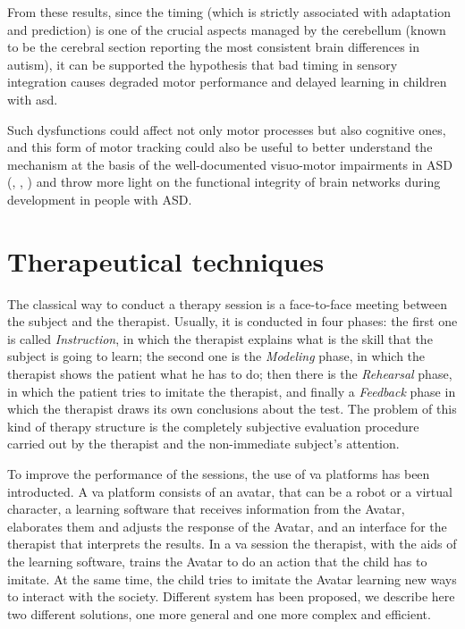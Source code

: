 \documentclass[12pt,journal,draftclsnofoot,onecolumn]{IEEEtran}
\begin{document}
From these results, since the timing (which is strictly associated with adaptation and prediction) is one of the crucial aspects managed by the cerebellum (known to be the cerebral section reporting the most consistent brain differences in autism), it can be supported the hypothesis that bad timing in sensory integration causes degraded motor performance and delayed learning in children with \gls{asd}.

Such dysfunctions could affect not only motor processes but also cognitive ones, and this form of motor tracking could also be useful to better understand the mechanism at the basis of the well-documented visuo-motor impairments in ASD (\cite{Chow2010}, \cite{Green2013}, \cite{Papa}) and throw more light on the functional integrity of brain networks during development in people with ASD.

\section{Therapeutical techniques}
\label{sec:thera_tech}

The classical way to conduct a therapy session is a face-to-face meeting between the subject and the therapist.
Usually, it is conducted in four phases: the first one is called \textit{Instruction}, in which the therapist explains what is the skill that the subject is going to learn; the second one is the \textit{Modeling} phase, in which the therapist shows the patient what he has to do; then there is the \textit{Rehearsal} phase, in which the patient tries to imitate the therapist, and finally a \textit{Feedback} phase in which the therapist draws its own conclusions about the test.
The problem of this kind of therapy structure is the completely subjective evaluation procedure carried out by the therapist and the non-immediate subject's attention.

To improve the performance of the sessions, the use of \gls{va} platforms has been introducted.
A \gls{va} platform consists of an avatar, that can be a robot or a virtual character, a learning software that receives information from the Avatar, elaborates them and adjusts the response of the Avatar, and an interface for the therapist that interprets the results.
In a \gls{va} session the therapist, with the aids of the learning software, trains the Avatar to do an action that the child has to imitate. At the same time, the child tries to imitate the Avatar learning new ways to interact with the society.
Different system has been proposed, we describe here two different solutions, one more general and one more complex and efficient.
\end{document}
